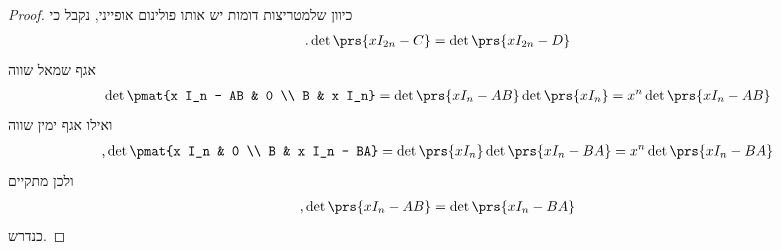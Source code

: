 \documentclass[a4paper,10pt,twoside,openany]{article}
\begin{document}
\begin{proof}
כיוון שלמטריצות דומות יש אותו פולינום אופייני, נקבל כי
\begin{align*}
\text{.} \det\prs{x I_{2n} - C} = \det\prs{x I_{2n} - D}
\end{align*}
אגף שמאל שווה
\begin{align*}
\det\pmat{x I_n - AB & 0 \\ B & x I_n} = \det\prs{x I_n - AB} \det\prs{x I_n} = x^n \det\prs{x I_n - AB}
\end{align*}
ואילו אגף ימין שווה
\begin{align*}
\text{,} \det\pmat{x I_n & 0 \\ B & x I_n - BA} = \det\prs{x I_n} \det\prs{x I_n - BA} = x^n \det\prs{x I_n - BA}
\end{align*}
ולכן מתקיים
\begin{align*}
\text{,} \det\prs{x I_n - AB} = \det\prs{x I_n - BA}
\end{align*}
כנדרש.
\end{proof}
\end{document}
